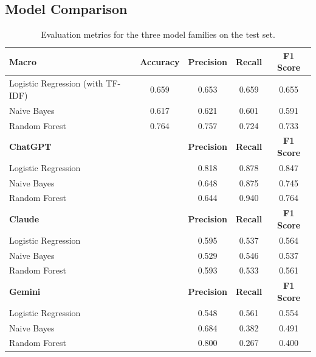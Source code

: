\documentclass[12pt]{article}
\begin{document}
\subsection{Model Comparison}
\begin{table}[h!]
\centering
\begin{tabular}{lcccc}
\hline
\textbf{Macro} & \textbf{Accuracy} & \textbf{Precision} & \textbf{Recall} & \textbf{F1 Score} \\
\hline
Logistic Regression (with TF-IDF) & 0.659 & 0.653 & 0.659 & 0.655 \\
Naive Bayes & 0.617 & 0.621 & 0.601 & 0.591 \\
Random Forest & 0.764 & 0.757 & 0.724 & 0.733 \\
\hline
\textbf{ChatGPT} & & \textbf{Precision} & \textbf{Recall} & \textbf{F1 Score} \\
\hline
Logistic Regression &  & 0.818 & 0.878 & 0.847 \\
Naive Bayes &  & 0.648 & 0.875 & 0.745 \\
Random Forest &  & 0.644 & 0.940 & 0.764 \\
\hline
\textbf{Claude} &  & \textbf{Precision} & \textbf{Recall} & \textbf{F1 Score} \\
\hline
Logistic Regression & & 0.595 & 0.537 & 0.564 \\
Naive Bayes & & 0.529 & 0.546 & 0.537 \\
Random Forest & & 0.593 & 0.533 & 0.561 \\
\hline
\textbf{Gemini} &  & \textbf{Precision} & \textbf{Recall} & \textbf{F1 Score} \\
\hline
Logistic Regression &  & 0.548 & 0.561 & 0.554 \\
Naive Bayes &  & 0.684 & 0.382 & 0.491 \\
Random Forest &  & 0.800 & 0.267 & 0.400 \\
\hline
\end{tabular}
\caption{Evaluation metrics for the three model families on the test set.}
\label{tab:model_metrics}
\end{table}
\end{document}
